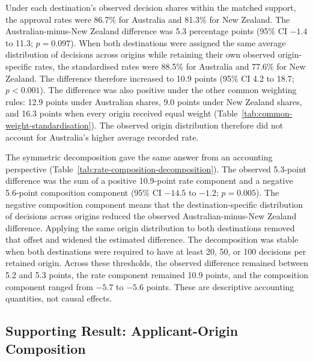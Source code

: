 \documentclass[runningheads]{llncs}
\begin{document}
Under each destination's observed decision shares within the matched support, the approval rates were 86.7\% for Australia and 81.3\% for New Zealand. The Australian-minus-New Zealand difference was 5.3 percentage points (95\% CI $-1.4$ to 11.3; $p=0.097$). When both destinations were assigned the same average distribution of decisions across origins while retaining their own observed origin-specific rates, the standardised rates were 88.5\% for Australia and 77.6\% for New Zealand. The difference therefore increased to 10.9 points (95\% CI 4.2 to 18.7; $p<0.001$). The difference was also positive under the other common weighting rules: 12.9 points under Australian shares, 9.0 points under New Zealand shares, and 16.3 points when every origin received equal weight (Table~\ref{tab:common-weight-standardisation}). The observed origin distribution therefore did not account for Australia's higher average recorded rate.

The symmetric decomposition gave the same answer from an accounting perspective (Table~\ref{tab:rate-composition-decomposition}). The observed 5.3-point difference was the sum of a positive 10.9-point rate component and a negative 5.6-point composition component (95\% CI $-14.5$ to $-1.2$; $p=0.005$). The negative composition component means that the destination-specific distribution of decisions across origins reduced the observed Australian-minus-New Zealand difference. Applying the same origin distribution to both destinations removed that offset and widened the estimated difference. The decomposition was stable when both destinations were required to have at least 20, 50, or 100 decisions per retained origin. Across these thresholds, the observed difference remained between 5.2 and 5.3 points, the rate component remained 10.9 points, and the composition component ranged from $-5.7$ to $-5.6$ points. These are descriptive accounting quantities, not causal effects.



\subsection{Supporting Result: Applicant-Origin Composition}
\end{document}
